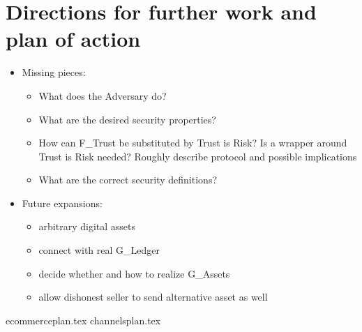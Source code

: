 \section{Directions for further work and plan of action}
\label{sec:plan}
  \begin{itemize}
    \item Missing pieces:
    \begin{itemize}
      \item What does the Adversary do?
      \item What are the desired security properties?
      \item How can F\_Trust be substituted by Trust is Risk? Is a wrapper around Trust is
      Risk needed? Roughly describe protocol and possible implications
      \item What are the correct security definitions?
    \end{itemize}
    \item Future expansions:
    \begin{itemize}
      \item arbitrary digital assets
      \item connect with real G\_Ledger
      \item decide whether and how to realize G\_Assets
      \item allow dishonest seller to send alternative asset as well
    \end{itemize}
  \end{itemize}

  {ecommerceplan.tex}
  {channelsplan.tex}
